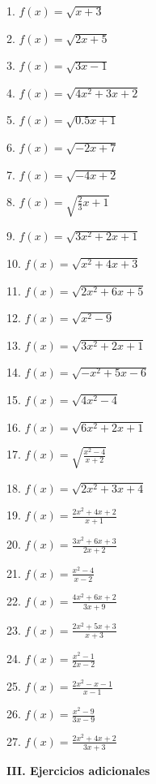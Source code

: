 \documentclass[]{book}
\begin{document}
\begin{multicols}{2}
1. $f(x) = \sqrt{x + 3}$
 
2. $f(x) = \sqrt{2x + 5}$
 
3. $f(x) = \sqrt{3x - 1}$
 
4. $f(x) = \sqrt{4x^2 + 3x + 2}$
 
5. $f(x) = \sqrt{0.5x + 1}$
 
6. $f(x) = \sqrt{-2x + 7}$
 
7. $f(x) = \sqrt{-4x + 2}$
 
8. $f(x) = \sqrt{\frac{2}{3}x+1}$
 
9. $f(x) = \sqrt{3x^2 + 2x + 1}$
 
10. $f(x) = \sqrt{x^2 + 4x + 3}$
 
11. $f(x) = \sqrt{2x^2 + 6x + 5}$
 
12. $f(x) = \sqrt{x^2 - 9}$
 
13. $f(x) = \sqrt{3x^2 + 2x + 1}$
 
14. $f(x) = \sqrt{-x^2 + 5x - 6}$
 
15. $f(x) = \sqrt{4x^2 - 4}$
 
16. $f(x) = \sqrt{6x^{2} + 2x + 1}$
 
17. $f(x) = \sqrt{\frac{x^2 - 4}{x + 2}}$
 
18. $f(x) = \sqrt{2x^2 + 3x + 4}$
 
19. $f(x) = \frac{2x^2 + 4x + 2}{x + 1}$
 
20. $f(x) = \frac{3x^2 + 6x + 3}{2x + 2}$
 
21. $f(x) = \frac{x^2 - 4}{x - 2}$
 
22. $f(x) = \frac{4x^2 + 6x + 2}{3x + 9}$
 
23. $f(x) = \frac{2x^2 + 5x + 3}{x + 3}$
 
24. $f(x) = \frac{x^2 - 1}{2x - 2}$
 
25. $f(x) = \frac{2x^2 - x - 1}{x - 1}$
 
26. $f(x) = \frac{x^2-9}{3x - 9}$
 
27. $f(x) = \frac{2x^2 + 4x + 2}{3x + 3}$
\end{multicols}

\textbf{III. Ejercicios adicionales}
\end{document}
